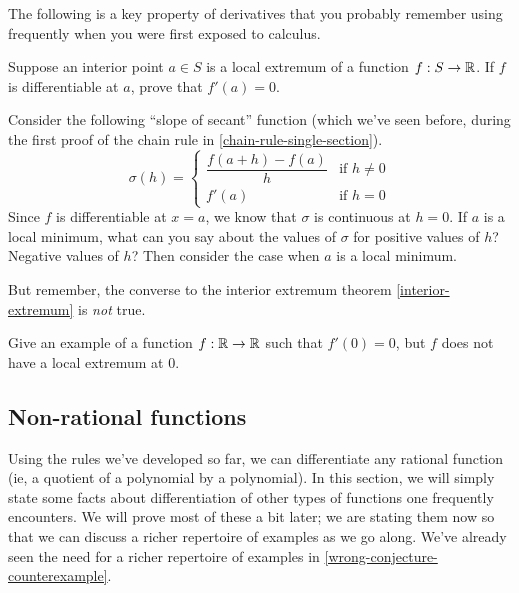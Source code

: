 
The following is a key property of derivatives that you probably remember using frequently when you were first exposed to calculus. 

\begin{exercise} \label{interior-extremum}  
	Suppose an interior point $a \in S$ is a local extremum of a function $f : S \to \mathbb{R}$. If $f$ is differentiable at $a$, prove that $f'(a) = 0$.
	\begin{hint} 
		Consider the following ``slope of secant'' function (which we've seen before, during the first proof of the chain rule in \cref{chain-rule-single-section}).
		\[ \sigma(h) = \begin{cases} \dfrac{f(a+h)-f(a)}{h} & \text{if } h \neq 0 \\ f'(a) & \text{if } h = 0 \end{cases} \]
		Since $f$ is differentiable at $x = a$, we know that $\sigma$ is continuous at $h = 0$. If $a$ is a local minimum, what can you say about the values of $\sigma$ for positive values of $h$? Negative values of $h$? Then consider the case when $a$ is a local minimum. 
	\end{hint}
\end{exercise}

But remember, the converse to the interior extremum theorem \ref{interior-extremum} is \emph{not} true. 

\begin{exercise} \label{interior-extremum-converse-false}
	Give an example of a function $f : \mathbb{R} \to \mathbb{R}$ such that $f'(0) = 0$, but $f$ does not have a local extremum at 0. 
\end{exercise}

\subsection{Non-rational functions} \label{non-rational}

Using the rules we've developed so far, we can differentiate any rational function (ie, a quotient of a polynomial by a polynomial). In this section, we will simply state some facts about differentiation of other types of functions one frequently encounters. We will prove most of these a bit later; we are stating them now so that we can discuss a richer repertoire of examples as we go along. We've already seen the need for a richer repertoire of examples in \cref{wrong-conjecture-counterexample}. 

